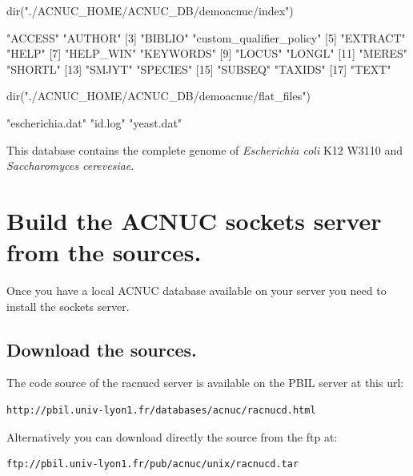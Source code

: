 \documentclass{article}
\begin{document}
\begin{Schunk}
\begin{Sinput}
 dir("./ACNUC_HOME/ACNUC_DB/demoacnuc/index")
\end{Sinput}
\begin{Soutput}
 [1] "ACCESS"                  "AUTHOR"                 
 [3] "BIBLIO"                  "custom_qualifier_policy"
 [5] "EXTRACT"                 "HELP"                   
 [7] "HELP_WIN"                "KEYWORDS"               
 [9] "LOCUS"                   "LONGL"                  
[11] "MERES"                   "SHORTL"                 
[13] "SMJYT"                   "SPECIES"                
[15] "SUBSEQ"                  "TAXIDS"                 
[17] "TEXT"                   
\end{Soutput}
\begin{Sinput}
 dir("./ACNUC_HOME/ACNUC_DB/demoacnuc/flat_files")
\end{Sinput}
\begin{Soutput}
[1] "escherichia.dat" "id.log"          "yeast.dat"      
\end{Soutput}
\end{Schunk}


This database contains the complete genome of \textit{Escherichia coli} 
K12 W3110 and \textit{Saccharomyces cerevesiae}.

\section{Build the ACNUC sockets server from the sources.}

Once you have a local  ACNUC database available on your server you need to install the sockets server.

\subsection{Download the sources.}

The code source of the racnucd server is available on the PBIL server  at this url:
\begin{verbatim}
http://pbil.univ-lyon1.fr/databases/acnuc/racnucd.html
\end{verbatim}
Alternatively you can download directly  the source from the ftp at:
\begin{verbatim}
ftp://pbil.univ-lyon1.fr/pub/acnuc/unix/racnucd.tar
\end{verbatim}
\end{document}
